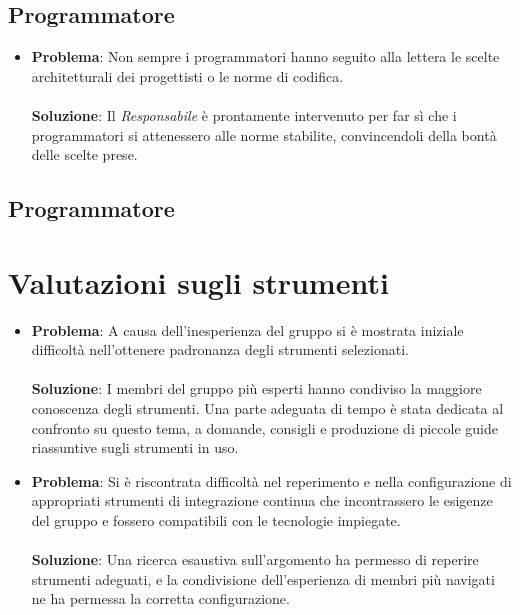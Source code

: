 \documentclass[openany,12pt,a4paper]{report}
\begin{document}
\subsection{Programmatore}
\begin{itemize}
	\item \textbf{Problema}: Non sempre i programmatori hanno seguito alla lettera le scelte architetturali dei progettisti o le norme di codifica. \\ \\
	\textbf{Soluzione}: Il \textit{Responsabile} è prontamente intervenuto per far sì che i programmatori si attenessero alle norme stabilite, convincendoli della bontà delle scelte prese.
\end{itemize}

\subsection{Programmatore}

\section{Valutazioni sugli strumenti}

\begin{itemize}
	\item \textbf{Problema}: A causa dell'inesperienza del gruppo si è mostrata iniziale difficoltà nell'ottenere padronanza degli strumenti selezionati. \\ \\
	\textbf{Soluzione}: I membri del gruppo più esperti hanno condiviso la maggiore conoscenza degli strumenti. Una parte adeguata di tempo è stata dedicata al confronto su questo tema, a domande, consigli e produzione di piccole guide riassuntive sugli strumenti in uso.
\end{itemize}

\begin{itemize}
	\item \textbf{Problema}: Si è riscontrata difficoltà nel reperimento e nella configurazione di appropriati strumenti di integrazione continua che incontrassero le esigenze del gruppo e fossero compatibili con le tecnologie impiegate. \\ \\
	\textbf{Soluzione}: Una ricerca esaustiva sull'argomento ha permesso di reperire strumenti adeguati, e la condivisione dell'esperienza di membri più navigati ne ha permessa la corretta configurazione.
\end{itemize}
\end{document}
